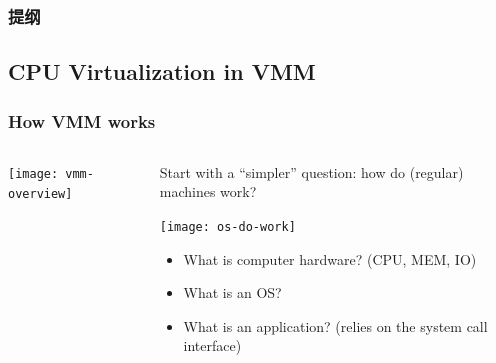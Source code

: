 \begin{frame}
\frametitle{提纲} %
\tableofcontents %
\end{frame}
\subsection{CPU Virtualization in VMM}
\begin{frame}
	\frametitle{How VMM works }
	
	
	
	\begin{columns}
		
		\begin{column}{.3\textwidth}
			
			\texttt{[image: vmm-overview]}
			
		\end{column}
		
		\begin{column}{.7\textwidth}
			
			Start with a “simpler” question:  how do (regular) machines work?	

			\centering
			\texttt{[image: os-do-work]}	
			
			\begin{itemize}
				\item What is computer hardware? (CPU, MEM, IO)
				\item What is an OS? 
				\item What is an application? (relies on the system call interface)
				
			\end{itemize} 
				
		\end{column}
		
		
	\end{columns}
	
	
\end{frame}


